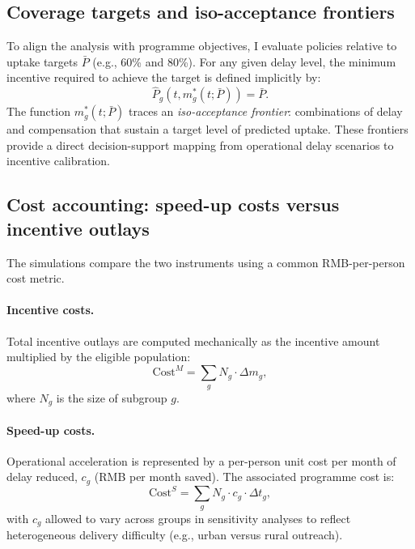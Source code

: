 \documentclass[doublespacing]{utdthesis}
\begin{document}
\subsection{Coverage targets and iso-acceptance frontiers}
\label{subsec:essay3_iso_acceptance}

To align the analysis with programme objectives, I evaluate policies relative to uptake targets $\bar{P}$ (e.g., 60\% and 80\%). For any given delay level, the minimum incentive required to achieve the target is defined implicitly by:
\begin{equation}
\widehat{P}_g(t, m^\ast_g(t;\bar{P})) = \bar{P}.
\end{equation}
The function $m^\ast_g(t;\bar{P})$ traces an \emph{iso-acceptance frontier}: combinations of delay and compensation that sustain a target level of predicted uptake. These frontiers provide a direct decision-support mapping from operational delay scenarios to incentive calibration.

\subsection{Cost accounting: speed-up costs versus incentive outlays}
\label{subsec:essay3_costs}

The simulations compare the two instruments using a common RMB-per-person cost metric.

\paragraph{Incentive costs.}
Total incentive outlays are computed mechanically as the incentive amount multiplied by the eligible population:
\begin{equation}
\text{Cost}^{M} = \sum_g N_g \cdot \Delta m_g,
\end{equation}
where $N_g$ is the size of subgroup $g$.

\paragraph{Speed-up costs.}
Operational acceleration is represented by a per-person unit cost per month of delay reduced, $c_g$ (RMB per month saved). The associated programme cost is:
\begin{equation}
\text{Cost}^{S} = \sum_g N_g \cdot c_g \cdot \Delta t_g,
\end{equation}
with $c_g$ allowed to vary across groups in sensitivity analyses to reflect heterogeneous delivery difficulty (e.g., urban versus rural outreach).
\end{document}
